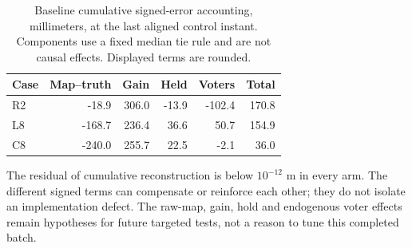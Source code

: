 \begin{table}[t]
\caption{Baseline cumulative signed-error accounting, millimeters, at the last aligned control instant. Components use a fixed median tie rule and are not causal effects. Displayed terms are rounded.}
\centering\footnotesize
\begin{tabular}{lrrrrr}\toprule
Case & Map--truth & Gain & Held & Voters & Total\\\midrule
R2 & -18.9 & 306.0 & -13.9 & -102.4 & 170.8 \\
L8 & -168.7 & 236.4 & 36.6 & 50.7 & 154.9 \\
C8 & -240.0 & 255.7 & 22.5 & -2.1 & 36.0 \\
\bottomrule\end{tabular}
\end{table}
The residual of cumulative reconstruction is below $10^{-12}$ m in every arm. The different signed terms can compensate or reinforce each other; they do not isolate an implementation defect. The raw-map, gain, hold and endogenous voter effects remain hypotheses for future targeted tests, not a reason to tune this completed batch.
